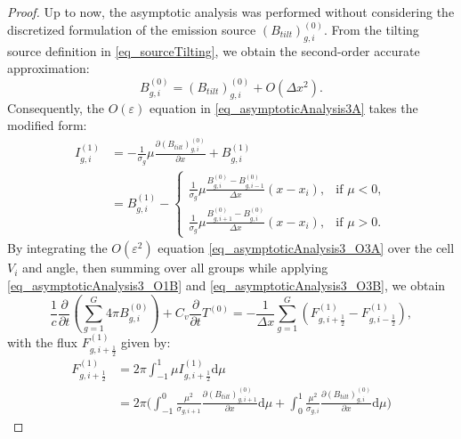 \documentclass[preprint,12pt]{elsarticle}
\theoremstyle{definition}
\theoremstyle{plain}
\numberwithin{equation}{section}
\numberwithin{algorithm}{section}
\newcounter{eq_count}
\newcommand{\dd}{{\text{d}}}
\newcommand{\pdrv}[2]{\frac{\partial{#1}}{\partial{#2}}}
\begin{document}
\begin{proof}
   
    Up to now, the asymptotic analysis was performed without considering  the discretized formulation of the emission source $(B_{tilt})_{g,i}^{(0)}$.
      From the tilting source definition in \eqref{eq_sourceTilting}, we obtain the second-order accurate approximation:
        \begin{equation}
      	B_{g,i}^{(0)} = (B_{tilt})_{g,i}^{(0)} + O(\Delta x^2).
      \end{equation}
      Consequently, the $O(\varepsilon)$ equation in \eqref{eq_asymptoticAnalysis3A} takes the modified form:
    \begin{equation*}
        \begin{aligned}
                I_{g,i}^{(1)} 
                &=- \frac{1}{ \sigma_g} \mu \pdrv{(B_{tilt})_{g,i}^{(0)} }{x}+  B_{g,i}^{(1)}
                \\
                &=   B_{g,i}^{(1)} -
                \begin{cases} 
                  \frac{1}{ \sigma_g} \mu		\frac{B^{(0)}_{g,i  } - B^{(0)}_{g,i-1}}{ \Delta x} \left( x - x_i \right), & \text{if } \mu < 0, \\
                  \frac{1}{ \sigma_g} \mu		\frac{B^{(0)}_{g,i + 1} - B^{(0)}_{g,i}}{ \Delta x} \left( x - x_i \right), & \text{if } \mu > 0.
                \end{cases}
        \end{aligned}
    \end{equation*}
By integrating the $O(\varepsilon^2)$ equation \eqref{eq_asymptoticAnalysis3_O3A} over the cell $V_i$ and angle, then summing over all groups while applying \eqref{eq_asymptoticAnalysis3_O1B} and \eqref{eq_asymptoticAnalysis3_O3B}, we obtain
   \begin{equation}
        \frac{1}{c} \frac{\partial }{\partial t} \left( \sum_{g=1}^G 4 \pi B_{g,i}^{(0)} \right)+C_v \frac{\partial }{\partial t} T^{(0)} = -\frac{1}{\Delta x} \sum_{g=1}^G (F_{g,i+\frac{1}{2}}^{(1)} - F_{g,i-\frac{1}{2}}^{(1)}  ) , 
    \end{equation}
with the flux $F_{g,i+\frac{1}{2}}^{(1)}$ given by:
    \begin{equation*}
        \begin{aligned}
              F_{g,i+\frac{1}{2}}^{(1)} &= 2\pi \int_{-1}^{1} \mu I_{g,i+\frac{1}{2}}^{(1)} \dd{\mu}
              \\
              & =  2\pi \Big( \int_{-1}^{0} \frac{\mu^2}{ \sigma_{g,i+1}}  \pdrv{(B_{tilt})_{g,i+1}^{(0)}}{x} \dd{\mu}  +  \int_{0}^{1} \frac{\mu^2}{ \sigma_{g,i}}  \pdrv{(B_{tilt})_{g,i}^{(0)}  }{x} \dd{\mu}  \Big)

\end{aligned}
\end{equation*}
\end{proof}
\end{document}
